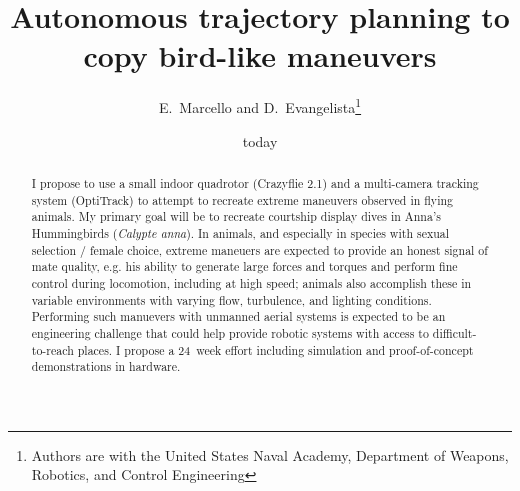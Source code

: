 \documentclass[onecolumn,10pt]{IEEEtran}
\title{Autonomous trajectory planning to copy bird-like maneuvers}
\author{E.~Marcello and D.~Evangelista\thanks{Authors are with the United States Naval Academy, Department of Weapons, Robotics, and Control Engineering}}
\date{today}
\begin{document}
\maketitle

\begin{abstract}
I propose to use a small indoor quadrotor (Crazyflie 2.1) and a multi-camera tracking system (OptiTrack) to attempt to recreate extreme maneuvers observed in flying animals.  My primary goal will be to recreate courtship display dives in Anna's Hummingbirds (\emph{Calypte anna}). In animals, and especially in species with sexual selection / female choice, extreme maneuers are expected to provide an honest signal of mate quality, e.g. his ability to generate large forces and torques and perform fine control during locomotion, including at high speed; animals also accomplish these in variable environments with varying flow, turbulence, and lighting conditions. Performing such manuevers with unmanned aerial systems is expected to be an engineering challenge that could help provide robotic systems with access to difficult-to-reach places. I propose a  \SI{24}{week} effort including simulation and proof-of-concept demonstrations in hardware. 

\end{abstract}
\end{document}
